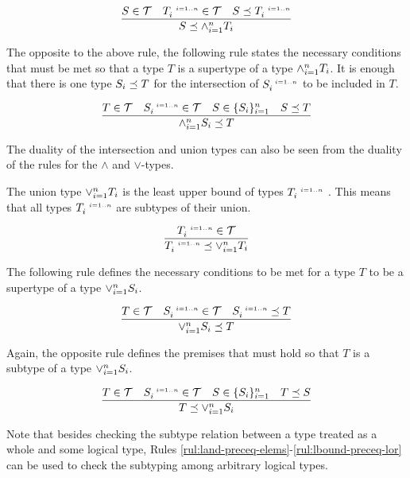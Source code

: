 \documentclass[runningheads]{llncs}
\newcommand{\s}{\scriptscriptstyle\ \,}
\newcommand{\T}{{\cal T}}
\begin{document}
\begin{equation}
\label{rul:lbound-preceq-land}
\dfrac{S\in\T\quad\/T_i^{\s\/i=1..n}\in\T\quad\/S\preceq\/T_i^{\s\/i=1..n}}
      {S\preceq\land_{i=1}^n\/T_i}  
\end{equation} 

The opposite to the above rule, the following rule states the
necessary conditions that must be met so that a type $T$ is a
supertype of a type $\land_{i=1}^n\/T_i$. It is enough that there is
one type $S_i\preceq\/T$ for the intersection of $S_i^{\s\/i=1..n}$ to
be included in $T$.

\begin{equation}
\label{rul:land-preceq-ubound}
\dfrac{T\in\T\quad\/S_i^{\s\/i=1..n}\in\T\quad\/S\in\{S_i\}_{i=1}^n\quad\/S\preceq\/T}
      {\land_{i=1}^n\/S_i\preceq\/T}  
\end{equation} 

The duality of the intersection and union types can also be seen from
the duality of the rules for the $\land$ and $\lor$-types.

The union type $\lor_{i=1}^n\/T_i$ is the least upper bound of
types $T_i^{\s\/i=1..n}$ \cite{Pierce1991}. This means that all types
$T_i^{\s\/i=1..n}$ are subtypes of their union. 

\begin{equation}
\label{rul:lor-preceq-elems}
\dfrac{T_i^{\s\/i=1..n}\in\T}
      {T_i^{\s\/i=1..n}\preceq\lor_{i=1}^n\/T_i}
\end{equation}

The following rule defines the necessary conditions to be met for a
type $T$ to be a supertype of a type $\lor_{i=1}^n\/S_i$.

\begin{equation}
\label{rul:lor-preceq-ubound}
\dfrac{T\in\T\quad\/S_i^{\s\/i=1..n}\in\T\quad\/S_i^{\s\/i=1..n}\preceq\/T}
      {\lor_{i=1}^n\/S_i\preceq\/T}  
\end{equation}

Again, the opposite rule defines the premises that must hold so that
$T$ is a subtype of a type $\lor_{i=1}^n\/S_i$.

\begin{equation}
\label{rul:lbound-preceq-lor}
\dfrac{T\in\T\quad\/S_i^{\s\/i=1..n}\in\T\quad\/S\in\{S_i\}_{i=1}^n\quad\/T\preceq\/S}
      {T\preceq\lor_{i=1}^n\/S_i}  
\end{equation}

Note that besides checking the subtype relation between a type treated
as a whole and some logical type, Rules
\ref{rul:land-preceq-elems}-\ref{rul:lbound-preceq-lor} can be used to
check the subtyping among arbitrary logical types.
\end{document}
